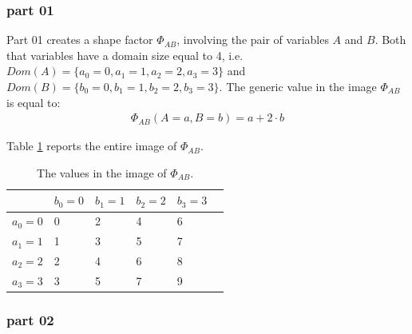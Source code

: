 \subsubsection{part 01}

Part 01 creates a shape factor $\Phi_{AB}$, involving the pair of variables $A$ and $B$. Both that variables have a domain size equal to 4, i.e. $Dom(A) = \lbrace a_0 = 0, a_1 =1 , a_2=2, a_3=3 \rbrace$ and  $Dom(B) = \lbrace b_0=0, b_1=1, b_2=2, b_3=3 \rbrace$.
The generic value in the image $\Phi_{AB}$ is equal to:
\begin{eqnarray}
 \Phi_{AB}(A = a, B= b) = a + 2 \cdot b
\end{eqnarray} 

Table \ref{tab:S_1:t1} reports the entire image of $\Phi_{AB}$.

\begin{table}[]
\centering
\begin{tabular}{l|l|l|l|l|l|}
      & $b_0 = 0$ & $b_1 = 1$ & $b_2 = 2$ & $b_3= 3$ \\
      \hline
$a_0 = 0$ & 0     & 2     & 4     & 6     \\
\hline
$a_1 = 1$ & 1     & 3     & 5     & 7     \\
\hline
$a_2 = 2$ & 2     & 4     & 6     & 8     \\
\hline 
$a_3 = 3$ & 3     & 5     & 7     & 9     \\
\hline 
\end{tabular}
\caption{The values in the image of $\Phi _{AB}$.} 
\label{tab:S_1:t1}
\end{table}

\subsubsection{part 02}

